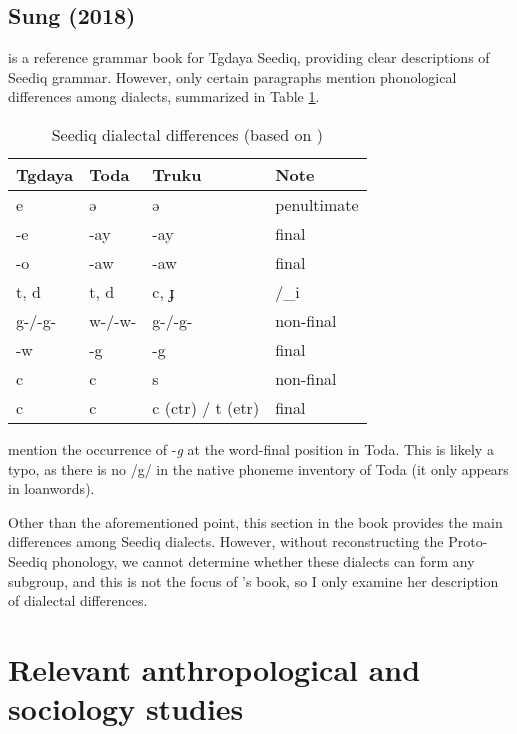\subsection{Sung (2018)}

\textcite{Sung2018Sedgrammar} is a reference grammar book for Tgdaya Seediq, providing clear descriptions of Seediq grammar. However, only certain paragraphs mention phonological differences among dialects, summarized in Table \ref{tab:sung2018}.

\begin{table}[!htbp]
\centering
\caption{Seediq dialectal differences (based on \cite[21--22]{Sung2018Sedgrammar})}
\label{tab:sung2018}
\begin{tabular}{llll}
\hline
Tgdaya & Toda   & Truku                       & Note        \\ \hline
e      & ə      & ə                           & penultimate \\
-e     & -ay    & -ay                         & final       \\
-o     & -aw    & -aw                         & final       \\
t, d   & t, d   & c, ɟ                        & /\_i        \\
g-/-g- & w-/-w- & g-/-g-                      & non-final   \\
-w     & -g     & -g                          & final       \\
c      & c      & s                           & non-final   \\
c      & c      & c (\ac{ctr}) / t (\ac{etr}) & final       \\ \hline
\end{tabular}
\end{table}

\textcite[22]{Sung2018Sedgrammar} mention the occurrence of -\textit{g} at the word-final position in Toda. This is likely a typo, as there is no /g/ in the native phoneme inventory of Toda (it only appears in loanwords). 

Other than the aforementioned point, this section in the book provides the main differences among Seediq dialects. However, without reconstructing the Proto-Seediq phonology, we cannot determine whether these dialects can form any subgroup, and this is not the focus of \citeauthor{Sung2018Sedgrammar}'s book, so I only examine her description of dialectal differences.

\section{Relevant anthropological and sociology studies} \label{sec:anth_lit}

